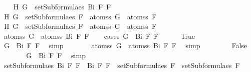 \begin{isabellebody}
\ \ \isamarkupfalse%
\ H{}{\isacharcolon}\ {\isachardoublequoteopen}G\ {\isasymin}\ setSubformulae{\isacharunderscore}s\ {\isacharparenleft}Bi\ F{}\ F{}{\isacharparenright}{\isachardoublequoteclose}\isanewline
\ \ \isamarkupfalse%
\ H{}{\isacharcolon}\ {\isachardoublequoteopen}G\ {\isasymin}\ setSubformulae{\isacharunderscore}s\ F{}\ {\isasymLongrightarrow}\ atoms{\isacharunderscore}s\ G\ {\isasymsubseteq}\ atoms{\isacharunderscore}s\ F{}{\isachardoublequoteclose}\isanewline
\ \ \isamarkupfalse%
\ H{}{\isacharcolon}\ {\isachardoublequoteopen}G\ {\isasymin}\ setSubformulae{\isacharunderscore}s\ F{}\ {\isasymLongrightarrow}\ atoms{\isacharunderscore}s\ G\ {\isasymsubseteq}\ atoms{\isacharunderscore}s\ F{}{\isachardoublequoteclose}\isanewline
\ \ \isamarkupfalse%
\ \isamarkupfalse%
\ {\isachardoublequoteopen}atoms{\isacharunderscore}s\ G\ {\isasymsubseteq}\ atoms{\isacharunderscore}s\ {\isacharparenleft}Bi\ F{}\ F{}{\isacharparenright}{\isachardoublequoteclose}\isanewline
\ \ \isamarkupfalse%
\ {\isacharparenleft}cases\ {\isachardoublequoteopen}G\ {\isacharequal}\ Bi\ F{}\ F{}{\isachardoublequoteclose}{\isacharparenright}\isanewline
\ \ \ \ \isamarkupfalse%
\ True\isanewline
\ \ \ \ \isamarkupfalse%
\ \isamarkupfalse%
\ {\isachardoublequoteopen}G\ {\isacharequal}\ Bi\ F{}\ F{}{\isachardoublequoteclose}\ \isamarkupfalse%
\ simp\isanewline
\ \ \ \ \isamarkupfalse%
\ \isamarkupfalse%
\ {\isachardoublequoteopen}atoms{\isacharunderscore}s\ G\ {\isasymsubseteq}\ atoms{\isacharunderscore}s\ {\isacharparenleft}Bi\ F{}\ F{}{\isacharparenright}{\isachardoublequoteclose}\ \isamarkupfalse%
\ simp\isanewline
\ \ \isamarkupfalse%
\isanewline
\ \ \ \ \isamarkupfalse%
\ False\isanewline
\ \ \ \ \isamarkupfalse%
\ \isamarkupfalse%
\ {}{\isacharcolon}{\isachardoublequoteopen}G\ {\isasymnoteq}\ Bi\ F{}\ F{}{\isachardoublequoteclose}\ \isamarkupfalse%
\ simp\isanewline
\ \ \ \ \isamarkupfalse%
\ {\isachardoublequoteopen}setSubformulae{\isacharunderscore}s\ {\isacharparenleft}Bi\ F{}\ F{}{\isacharparenright}\ {\isacharequal}\ {\isacharbraceleft}Bi\ F{}\ F{}{\isacharbraceright}\ {\isasymunion}\ setSubformulae{\isacharunderscore}s\ F{}\ {\isasymunion}\ setSubformulae{\isacharunderscore}s\ F{}{\isachardoublequoteclose}\ \isamarkupfalse%

\end{isabellebody}
